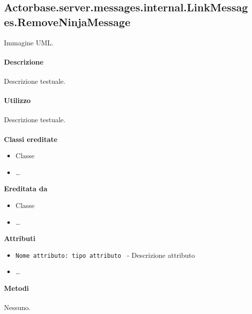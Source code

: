 \documentclass[a4paper]{article}
\begin{document}
	\subsection{Actorbase.server.messages.internal.LinkMessages.RemoveNinjaMessage}
		Immagine UML.
		\\ \\
		\textbf{Descrizione}
			\\ \\
			Descrizione testuale.
			\\ \\
		\textbf{Utilizzo}
			\\ \\
			Descrizione testuale.
			\\ \\
		\textbf{Classi ereditate}
			\begin{itemize}
				\item Classe
				\item \dots
			\end{itemize}
		\textbf{Ereditata da}
			\begin{itemize}
				\item Classe
				\item \dots
			\end{itemize}
		\textbf{Attributi}
			\begin{itemize}
				\item \texttt{Nome attributo: tipo attributo } - Descrizione attributo
				\item \dots
			\end{itemize}
		\textbf{Metodi}
			\\ \\
			Nessuno.
			
\end{document}
